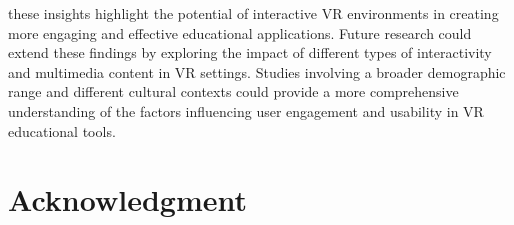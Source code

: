\documentclass[conference]{IEEEtran}
\begin{document}
these insights highlight the potential of interactive VR environments in creating more engaging and effective educational applications. Future research could extend these findings by exploring the impact of different types of interactivity and multimedia content in VR settings. Studies involving a broader demographic range and different cultural contexts could provide a more comprehensive understanding of the factors influencing user engagement and usability in VR educational tools.

\section*{Acknowledgment}





\end{document}
